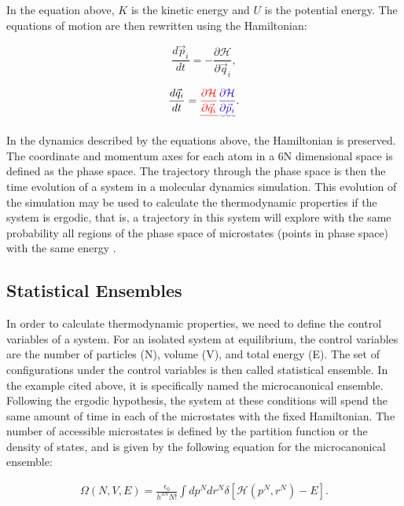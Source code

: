 \documentclass[
	12pt,				%
	openany,			%
	oneside,			%
	a4paper,			%
	english,			%
	brazil				%
	]{abntex2}
\providecommand{\DIFadd}[1]{{\protect\color{blue}\uwave{#1}}}
\providecommand{\DIFdel}[1]{{\protect\color{red}\sout{#1}}}
\providecommand{\DIFaddbegin}{}
\providecommand{\DIFaddend}{}
\providecommand{\DIFdelbegin}{}
\providecommand{\DIFdelend}{}
\providecommand{\DIFadd}[1]{{\protect\color{blue}\uwave{#1}}} %
\providecommand{\DIFdel}[1]{{\protect\color{red}\sout{#1}}}                      %
\providecommand{\DIFaddbegin}{} %
\providecommand{\DIFaddend}{} %
\providecommand{\DIFdelbegin}{} %
\providecommand{\DIFdelend}{} %
\begin{document}
In the equation above, $K$ is the kinetic energy and $U$ is the potential energy. The equations of motion are then rewritten using the Hamiltonian:

\begin{equation}
\frac{d \vec{p}_{i}}{dt} = - \frac{\partial \mathcal{H}}{\partial \vec{q}_{i}},
\end{equation}

\begin{equation}
\frac{d \vec{q}_{i}}{dt} =  \DIFdelbegin \DIFdel{\frac{\partial \mathcal{H}}{\partial \vec{q}_{i}}}\DIFdelend \DIFaddbegin \DIFadd{\frac{\partial \mathcal{H}}{\partial \vec{p}_{i}}}\DIFaddend .
\end{equation}

In the dynamics described by the equations above, the Hamiltonian is preserved. The coordinate and momentum axes for each atom in a 6N dimensional space is defined as the phase space. The trajectory through the phase space is then the time evolution of a system in a molecular dynamics simulation. This evolution of the simulation may be used to calculate the thermodynamic properties if the system is ergodic, that is, a trajectory in this system will explore with the same probability all regions of the phase space of microstates (points in phase space) with the same energy \cite{shell2015}. 

\subsection{Statistical Ensembles}

In order to calculate thermodynamic properties, we need to define the control variables of a system. For an isolated system at equilibrium, the control variables are the number of particles (N), volume (V), and total energy (E). The set of configurations under the control variables is then called statistical ensemble. In the example cited above, it is specifically named the microcanonical ensemble. Following the ergodic hypothesis, the system at these conditions will spend the same amount of time in each of the microstates with the fixed Hamiltonian.  The number of accessible microstates is defined by the partition function or the density of states, and  is given by the following equation  for the microcanonical ensemble: 

\begin{equation}
\begin{aligned}
\Omega (N,V,E) = \frac{\epsilon_{0}}{h^{3N}N!} \int dp^{N} dr^{N} \delta [\mathcal{H}(p^{N},r^{N}) -E].
\end{aligned}
\end{equation}
\end{document}

